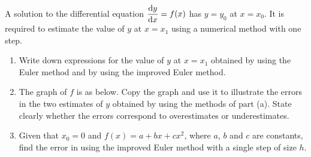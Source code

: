 \documentclass{echw}
\begin{document}
    \problem{}
        A solution to the differential equation $\dfrac{\mathrm{d} y}{\mathrm{d} x} = f(x)$ has $y = y_0$ at $x = x_0$. It is required to estimate the value of $y$ at $x = x_1$ using a numerical method with one step.
        \begin{enumerate}
            \item Write down expressions for the value of $y$ at $x = x_1$ obtained by using the Euler method and by using the improved Euler method.
            \item The graph of $f$ is as below. Copy the graph and use it to illustrate the errors in the two estimates of $y$ obtained by using the methods of part (a). State clearly whether the errors correspond to overestimates or underestimates.
        \end{enumerate}
        \begin{center}
        \end{center}
        \begin{enumerate}
            \setcounter{enumi}{2}
            \item Given that $x_0 = 0$ and $f(x) = a + bx + cx^2$, where $a$, $b$ and $c$ are constants, find the error in using the improved Euler method with a single step of size $h$.
        \end{enumerate}
\end{document}
